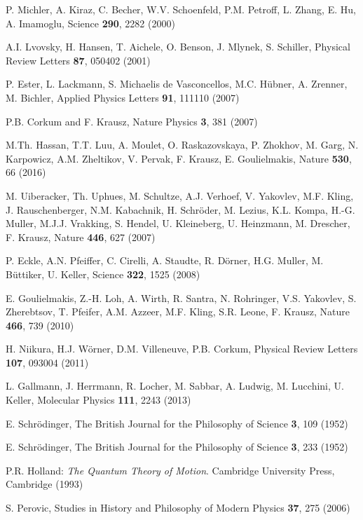 \documentclass[final,3p,12pt]{elsarticle3}
\begin{document}
\begin{thebibliography}{88}
P. Michler, A. Kiraz, C. Becher, W.V. Schoenfeld, P.M. Petroff, L. Zhang,
E. Hu, A. Imamoglu, Science {\bf 290}, 2282 (2000)

A.I. Lvovsky, H. Hansen, T. Aichele, O. Benson, J. Mlynek, S. Schiller,
Physical Review Letters {\bf 87}, 050402 (2001)

P. Ester, L. Lackmann, S. Michaelis de Vasconcellos, M.C. H\"ubner, A. Zrenner,
M. Bichler, Applied Physics Letters {\bf 91}, 111110 (2007)

P.B. Corkum and F. Krausz, Nature Physics {\bf 3}, 381 (2007)

M.Th. Hassan, T.T. Luu, A. Moulet, O. Raskazovskaya, P. Zhokhov, M. Garg,
N. Karpowicz, A.M. Zheltikov, V. Pervak, F. Krausz, E. Goulielmakis,
Nature {\bf 530}, 66 (2016)

M. Uiberacker, Th. Uphues, M. Schultze, A.J. Verhoef, V. Yakovlev, M.F. Kling, 
J. Rauschenberger, N.M. Kabachnik, H. Schr\"oder, M. Lezius, K.L. Kompa, H.-G. Muller, 
M.J.J. Vrakking, S. Hendel, U. Kleineberg, U. Heinzmann, M. Drescher, F. Krausz,
Nature {\bf 446}, 627 (2007)

P. Eckle, A.N. Pfeiffer, C. Cirelli, A. Staudte, R. D\"orner, H.G. Muller, M. B\"uttiker,
U. Keller, Science {\bf 322}, 1525 (2008)

E. Goulielmakis, Z.-H. Loh, A. Wirth, R. Santra, N. Rohringer, V.S. Yakovlev, 
S. Zherebtsov, T. Pfeifer, A.M. Azzeer, M.F. Kling, S.R. Leone, F. Krausz,
Nature {\bf 466}, 739 (2010)

H. Niikura, H.J. W\"orner, D.M. Villeneuve, P.B. Corkum,
Physical Review Letters {\bf 107}, 093004 (2011)

L. Gallmann, J. Herrmann, R. Locher, M. Sabbar, A. Ludwig, 
M. Lucchini, U. Keller, Molecular Physics {\bf 111}, 2243
(2013)

E. Schr\"odinger, The British Journal for the Philosophy of Science
{\bf 3}, 109 (1952)

E. Schr\"odinger, The British Journal for the Philosophy of Science
{\bf 3}, 233 (1952)

P.R. Holland: {\it The Quantum Theory of Motion}.
Cambridge University Press, Cambridge (1993)

S. Perovic, 
Studies in History and Philosophy of Modern Physics {\bf 37}, 275 (2006)


\end{thebibliography}
\end{document}
